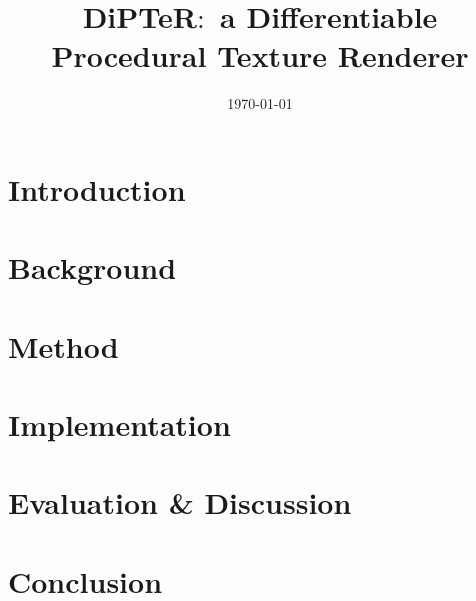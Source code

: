 \documentclass[nofilelist]{template/cslthse-msc}
\title{DiPTeR$:$ a Differentiable Procedural Texture Renderer}
\date{\today}
\begin{document}
\renewcommand{\bibname}{References}

\makefrontmatter
\chapter{Introduction}


\chapter{Background}


\chapter{Method}


\chapter{Implementation}


\chapter{Evaluation \& Discussion}


\chapter{Conclusion}

 
{}

\begin{appendices}


\checkoddpage
\ifoddpage
\else
   \newpage
   \thispagestyle{empty}
   \mbox{ }
\fi


\end{appendices}
\end{document}
